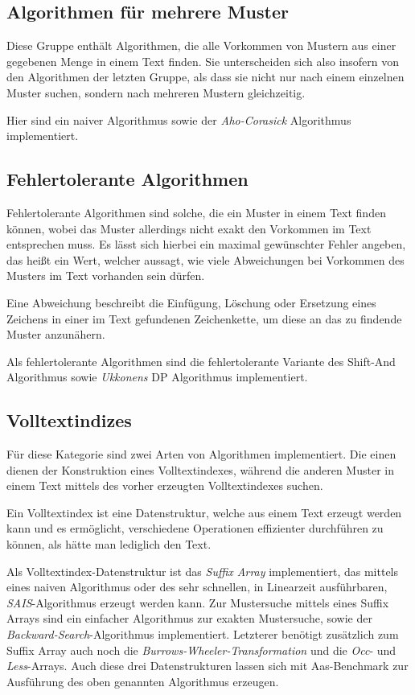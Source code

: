 \documentclass[twocolumn]{article}
\begin{document}
\subsection{Algorithmen für mehrere Muster}

Diese Gruppe enthält Algorithmen, die alle Vorkommen von Mustern aus einer gegebenen Menge in einem Text finden. Sie unterscheiden sich also insofern von den Algorithmen der letzten Gruppe, als dass sie nicht nur nach einem einzelnen Muster suchen, sondern nach mehreren Mustern gleichzeitig.

Hier sind ein naiver Algorithmus sowie der \textit{Aho-Corasick} Algorithmus implementiert.

\subsection{Fehlertolerante Algorithmen}

Fehlertolerante Algorithmen sind solche, die ein Muster in einem Text finden können, wobei das Muster allerdings nicht exakt den Vorkommen im Text entsprechen muss. Es lässt sich hierbei ein maximal gewünschter Fehler angeben, das heißt ein Wert, welcher aussagt, wie viele Abweichungen bei Vorkommen des Musters im Text vorhanden sein dürfen.

Eine Abweichung beschreibt die Einfügung, Löschung oder Ersetzung eines Zeichens in einer im Text gefundenen Zeichenkette, um diese an das zu findende Muster anzunähern.

Als fehlertolerante Algorithmen sind die fehlertolerante Variante des Shift-And Algorithmus sowie \textit{Ukkonens} DP Algorithmus implementiert.

\subsection{Volltextindizes}

Für diese Kategorie sind zwei Arten von Algorithmen implementiert. Die einen dienen der Konstruktion eines Volltextindexes, während die anderen Muster in einem Text mittels des vorher erzeugten Volltextindexes suchen.

Ein Volltextindex ist eine Datenstruktur, welche aus einem Text erzeugt werden kann und es ermöglicht, verschiedene Operationen effizienter durchführen zu können, als hätte man lediglich den Text.

Als Volltextindex-Datenstruktur ist das \textit{Suffix Array} implementiert, das mittels eines naiven Algorithmus oder des sehr schnellen, in Linearzeit ausführbaren, \textit{SAIS}-Algorithmus erzeugt werden kann. Zur Mustersuche mittels eines Suffix Arrays sind ein einfacher Algorithmus zur exakten Mustersuche, sowie der \textit{Backward-Search}-Algorithmus implementiert. Letzterer benötigt zusätzlich zum Suffix Array auch noch die \textit{Burrows-Wheeler-Transformation} und die \textit{Occ}- und \textit{Less}-Arrays. Auch diese drei Datenstrukturen lassen sich mit Aas-Benchmark zur Ausführung des oben genannten Algorithmus erzeugen.
\end{document}
